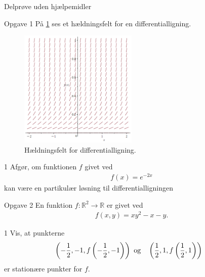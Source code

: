 \begin{center}
\LARGE
Delprøve uden hjælpemidler 
\end{center}
\begin{opgavetekst}{Opgave 1}
	På \ref{fig:haeldning} ses et hældningsfelt for en differentialligning.
	\begin{figure}[H]
		\centering
		\includegraphics[width=0.5\textwidth]{Billeder/haeldning.png}
		\caption{Hældningsfelt for differentialligning.}
		\label{fig:haeldning}
	\end{figure}
	\phantom{h}
\end{opgavetekst}
	\begin{delopgave}{}{1}
		Afgør, om funktionen $f$ givet ved
		\begin{align*}
			f(x) = e^{-2x}
		\end{align*}
		kan være en partikulær løsning til differentialligningen
	\end{delopgave}
\begin{opgavetekst}{Opgave 2}
	En funktion $f:\mathbb{R}^2 \to \mathbb{R}$ er givet ved
	\begin{align*}
		f(x,y) = xy^2-x-y.
	\end{align*}
	\phantom{h}
\end{opgavetekst}
	\begin{delopgave}{}{1}
		Vis, at punkterne 
		\begin{align*}
			&\left(-\frac{1}{2},-1,f\left(-\frac{1}{2},-1\right)\right)\textnormal{ og} 
			&&\left(\frac{1}{2},1,f\left(\frac{1}{2},1\right)\right)
		\end{align*}
		er stationære punkter for $f$. 
	\end{delopgave}
